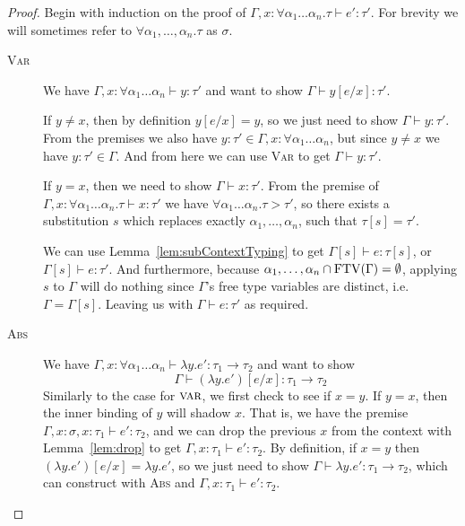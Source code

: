 \begin{proof}
  Begin with induction on the proof of $\Gamma , x : \forall \alpha_1 \ldots \alpha_n . \tau \vdash e'
  : \tau'$. For brevity we will sometimes refer to $\forall \alpha_1,\ldots,\alpha_n . \tau$ as $\sigma$.
  \begin{description}
  \item[\rm\textsc{Var}] We have
    $\Gamma , x : \forall\alpha_1\ldots\alpha_n \vdash y : \tau'$ and want to show $\Gamma \vdash y[e/x] : \tau'$.

    If $y \neq x$, then by definition $y [e/x] = y$, so we just need to
    show $\Gamma \vdash y : \tau'$. From the premises we also have
    $y : \tau' \in \Gamma , x : \forall\alpha_1\ldots\alpha_n$, but since $y \ne x$ we have $y : \tau' \in \Gamma$. And
    from here we can use \textsc{Var} to get $\Gamma \vdash y : \tau'$.

    If $y = x$, then we need to show $\Gamma \vdash x : \tau'$. From the premise of
    ${\Gamma , x : \forall \alpha_1\ldots\alpha_n . \tau \vdash x : \tau'}$ we have
    ${\forall \alpha_1\ldots\alpha_n . \tau > \tau'}$, so there exists a substitution
    $s$ which replaces exactly $\alpha_1,\ldots,\alpha_n$, such that
    $\tau[s] = \tau'$.

    We can use Lemma~\ref{lem:subContextTyping} to get
    $\Gamma[s] \vdash e : \tau[s]$, or $\Gamma[s] \vdash e : \tau'$. And furthermore, because
    ${\alpha_1 , \ldots, \alpha_n \cap \operatorname{FTV}(\Gamma) = \emptyset}$, applying $s$ to $\Gamma$ will do
    nothing since $\Gamma$'s free type variables are distinct, i.e. $\Gamma =
    \Gamma[s]$. Leaving us with $\Gamma \vdash e : \tau'$ as required.

  \item[\rm\textsc{Abs}]
    We have $\Gamma , x : \forall\alpha_1\ldots\alpha_n \vdash \lambda y . e' : \tau_1 \rightarrow \tau_2$ and want to show
    \[\Gamma \vdash (\lambda y . e')[e/x] : \tau_1 \rightarrow \tau_2\]
    Similarly to the case for $\textsc{var}$, we first check to see if
    $x = y$. If $y = x$, then the inner binding of $y$ will shadow $x$. That
    is, we have the premise $\Gamma , x : \sigma, x : \tau_1 \vdash e' : \tau_2$, and we can
    drop the previous $x$ from the context with
    Lemma~\ref{lem:drop} to get $\Gamma , x : \tau_1 \vdash e' : \tau_2$.
    By definition, if $x = y$ then $(\lambda y . e')[e/x] = \lambda y . e'$, so we
    just need to show $\Gamma \vdash \lambda y . e' : \tau_1 \rightarrow \tau_2$, which can construct
    with \textsc{Abs} and $\Gamma , x : \tau_1 \vdash e' : \tau_2$.


\end{description}
\end{proof}
